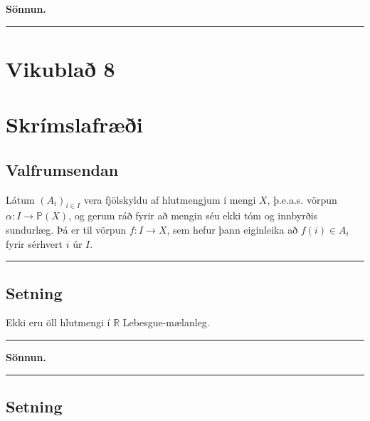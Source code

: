 \documentclass[]{book}
\begin{document}
\textbf{Sönnun.}

\begin{center}\rule{0.5\linewidth}{\linethickness}\end{center}

\hypertarget{vikubla-8}{%
\chapter*{Vikublað 8}\label{vikubla-8}}

\hypertarget{skrimslafri}{%
\chapter{Skrímslafræði}\label{skrimslafri}}

\hypertarget{valfrumsendan}{%
\section{Valfrumsendan}\label{valfrumsendan}}

Látum \((A_i)_{i\in I}\) vera fjölskyldu af hlutmengjum í mengi \(X\), þ.e.a.s. vörpun \(\alpha:I\rightarrow\mathbb P(X)\), og gerum ráð fyrir að mengin séu ekki tóm og innbyrðis sundurlæg. Þá er til vörpun \(f:I\rightarrow X\), sem hefur þann eiginleika að \(f(i)\in A_i\) fyrir sérhvert \(i\) úr \(I\).

\begin{center}\rule{0.5\linewidth}{\linethickness}\end{center}

\hypertarget{setning-63}{%
\section{Setning}\label{setning-63}}

Ekki eru öll hlutmengi í \(\mathbb R\) Lebesgue-mælanleg.

\begin{center}\rule{0.5\linewidth}{\linethickness}\end{center}

\textbf{Sönnun.}

\begin{center}\rule{0.5\linewidth}{\linethickness}\end{center}

\hypertarget{setning-64}{%
\section{Setning}\label{setning-64}}
\end{document}
